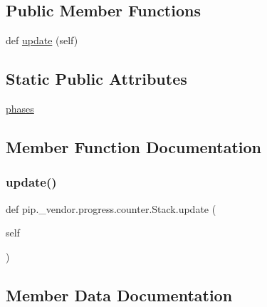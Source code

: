 \subsection*{Public Member Functions}
\begin{DoxyCompactItemize}
\item 
def \hyperlink{classpip_1_1__vendor_1_1progress_1_1counter_1_1Stack_af271659d85b633bbd2954fba09b3371f}{update} (self)
\end{DoxyCompactItemize}
\subsection*{Static Public Attributes}
\begin{DoxyCompactItemize}
\item 
\hyperlink{classpip_1_1__vendor_1_1progress_1_1counter_1_1Stack_aa8bcdf2b4db327e54684283b899ba8a8}{phases}
\end{DoxyCompactItemize}


\subsection{Member Function Documentation}
\mbox{\label{classpip_1_1__vendor_1_1progress_1_1counter_1_1Stack_af271659d85b633bbd2954fba09b3371f}} 
\subsubsection{\texorpdfstring{update()}{update()}}
{\footnotesize\ttfamily def pip.\+\_\+vendor.\+progress.\+counter.\+Stack.\+update (\begin{DoxyParamCaption}\item[{}]{self }\end{DoxyParamCaption})}



\subsection{Member Data Documentation}
\mbox{\label{classpip_1_1__vendor_1_1progress_1_1counter_1_1Stack_aa8bcdf2b4db327e54684283b899ba8a8}} 
